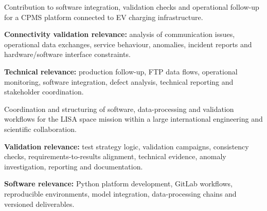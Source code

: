 \documentclass[8pt,a4paper,ragged2e,withhyper]{altacv}
\begin{document}
Contribution to software integration, validation checks and operational follow-up for a CPMS platform connected to EV charging infrastructure.

\textbf{Connectivity validation relevance:} analysis of communication issues, operational data exchanges, service behaviour, anomalies, incident reports and hardware/software interface constraints.

\textbf{Technical relevance:} production follow-up, FTP data flows, operational monitoring, software integration, defect analysis, technical reporting and stakeholder coordination.

\divider


Coordination and structuring of software, data-processing and validation workflows for the LISA space mission within a large international engineering and scientific collaboration.

\textbf{Validation relevance:} test strategy logic, validation campaigns, consistency checks, requirements-to-results alignment, technical evidence, anomaly investigation, reporting and documentation.

\textbf{Software relevance:} Python platform development, GitLab workflows, reproducible environments, model integration, data-processing chains and versioned deliverables.
\newpage
{}

\vspace{-.3cm}


{\small
{}
}

\divider\smallskip
\vspace{-.3cm}


{\small
{}
}
\end{document}
